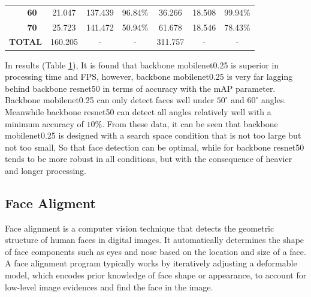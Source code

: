 \begin{table}[pt]
{\begin{tabular}{|c|c|c|c|c|c|c|c|}
    \cline{2-8}
                                      & \textbf{60}       & 21.047                                                                     & 137.439      & 96.84\%      & 36.266                                                                                       & 18.508       & 99.94\%       \\ 
    \cline{2-8}
                                      & \textbf{70}       & 25.723                                                                     & 141.472      & 50.94\%      & 61.678                                                                                       & 18.546       & 78.43\%       \\ 
    \hline
    \multicolumn{2}{|l|}{\textbf{TOTAL}}                  & 160.205                                                                    & -            & -            & 311.757                                                                                      & -            & -             \\
    \hline
    \end{tabular}}
  \label{table:pendeteksianberdasarkansudut}
\end{table}

In results (Table \ref{table:pendeteksianberdasarkansudut}), It is found that backbone mobilenet0.25 is superior in processing time and FPS, however, backbone mobilenet0.25 is very far
lagging behind backbone resnet50 in terms of accuracy with the mAP parameter. Backbone mobilenet0.25 can only detect faces well under $50^\circ$ and $60^\circ$ angles.
Meanwhile backbone resnet50 can detect all angles relatively well with a minimum accuracy of $10\%$. From these data, it can be seen that backbone mobilenet0.25 is designed with a search space condition that is not too large but not too small,
So that face detection can be optimal, while for backbone resnet50 tends to be more robust in all conditions, but with the consequence of heavier and longer processing.

\subsection{Face Aligment}
Face alignment is a computer vision technique that detects the geometric structure of human faces in digital images. It automatically determines the shape of face components such as eyes and nose based on the location and size of a face. A face alignment program typically works by iteratively adjusting a deformable model, which encodes prior knowledge of face shape or appearance, to account for low-level image evidences and find the face in the image.

